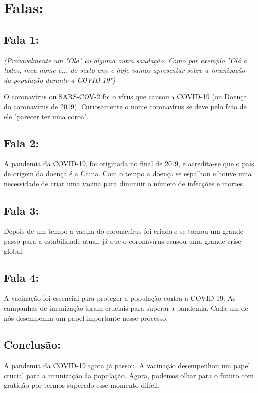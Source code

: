 \section{Falas:}  %
\subsection{Fala 1:}  %
\textit{(Provavelmente um "Olá" ou alguma outra saudação. Como por exemplo "Olá a todos, meu nome é... do sexto ano e hoje vamos apresentar sobre a imunização da população durante a COVID-19")}  %

O coronavírus ou SARS-COV-2 foi o vírus que causou a COVID-19 (ou Doença do coronavírus de 2019). Curiosamente o nome coronavírus se deve pelo fato de ele "parecer ter uma coroa".
\subsection{Fala 2:}
A pandemia da COVID-19, foi originada no final de 2019, e acredita-se que o país de origem da doença é a China. Com o tempo a doença se espalhou e houve uma necessidade de criar uma vacina para diminuir o número de infecções e mortes.
\subsection{Fala 3:}
Depois de um tempo a vacina do coronavírus foi criada e se tornou um grande passo para a estabilidade atual, já que o coronavírus causou uma grande crise global.
\subsection{Fala 4:}
A vacinação foi essencial para proteger a população contra a COVID-19. As campanhas de imunização foram cruciais para superar a pandemia. Cada um de nós desempenha um papel importante nesse processo.
\subsection{Conclusão:}
A pandemia da COVID-19 agora já passou. A vacinação desempenhou um papel crucial para a imunização da população. Agora, podemos olhar para o futuro com gratidão por termos superado esse momento difícil.